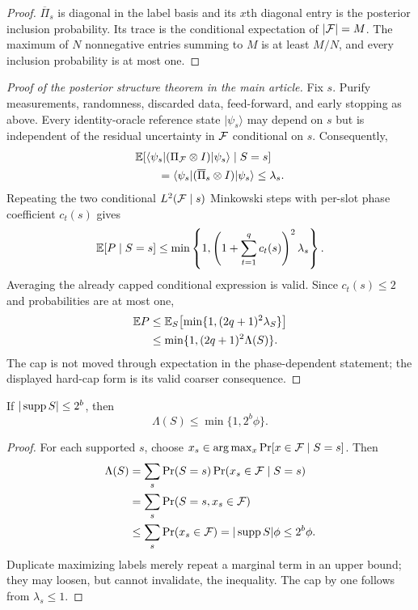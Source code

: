 \begin{proof}
$\overline\Pi_s$ is diagonal in the label basis and its $x$th diagonal entry
is the posterior inclusion probability. Its trace is the conditional
expectation of $|\mathcal{F}|=M$. The maximum of $N$ nonnegative entries summing to $M$
is at least $M/N$, and every inclusion probability is at most one.
\end{proof}

\begin{proof}[Proof of the posterior structure theorem in the main article]
Fix $s$. Purify measurements, randomness, discarded data, feed-forward, and
early stopping as above. Every identity-oracle reference state
$|\psi_s\rangle$ may depend on $s$ but is independent of the residual
uncertainty in $\mathcal{F}$ conditional on $s$. Consequently,
\begin{align}
 &\mathbb{E}[\langle\psi_s|(\Pi_{\mathcal{F}}\otimes I)|\psi_s\rangle\mid S=s]\\
 &\qquad=\langle\psi_s|(\overline\Pi_s\otimes I)|\psi_s\rangle
 \leq\lambda_s.
 \label{eq:posterior-reference}
\end{align}
Repeating the two conditional $L^2(\mathcal{F}\mid s)$ Minkowski steps with per-slot
phase coefficient $c_t(s)$ gives
\begin{equation}
 \mathbb{E}[P\mid S=s]
 \leq\min\left\{1,
 \left(1+\sum_{t=1}^{q}c_t(s)\right)^2\lambda_s\right\}.
 \label{eq:posterior-conditional}
\end{equation}
Averaging the already capped conditional expression is valid. Since
$c_t(s)\leq2$ and probabilities are at most one,
\begin{align}
 \mathbb{E} P
 &\leq\mathbb{E}_S\!\left[\min\{1,(2q+1)^2\lambda_S\}\right]\\
 &\leq\min\{1,(2q+1)^2\Lambda(S)\}.
\end{align}
The cap is not moved through expectation in the phase-dependent statement;
the displayed hard-cap form is its valid coarser consequence.
\end{proof}

\begin{lemma}
If $|\operatorname{supp} S|\leq2^b$, then
\begin{equation}
 \Lambda(S)\leq\min\{1,2^b\phi\}.
\end{equation}
\label{lem:finite-advice}
\end{lemma}

\begin{proof}
For each supported $s$, choose
$x_s\in\arg\max_x\Pr[x\in\mathcal{F}\mid S=s]$. Then
\begin{align}
 \Lambda(S)
 &=\sum_s\Pr(S=s)\Pr(x_s\in\mathcal{F}\mid S=s)\\
 &=\sum_s\Pr(S=s,x_s\in\mathcal{F})\\
 &\leq\sum_s\Pr(x_s\in\mathcal{F})
 =|\operatorname{supp} S|\phi\leq2^b\phi.
\end{align}
Duplicate maximizing labels merely repeat a marginal term in an upper bound;
they may loosen, but cannot invalidate, the inequality. The cap by one follows
from $\lambda_s\leq1$.
\end{proof}

